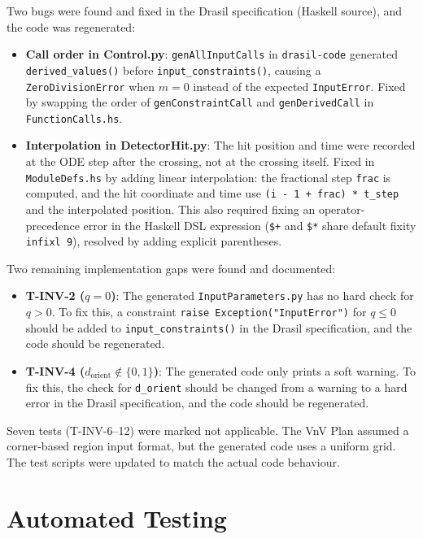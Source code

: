 \documentclass[12pt, titlepage]{article}
\begin{document}
Two bugs were found and fixed in the Drasil specification (Haskell source),
and the code was regenerated:
\begin{itemize}
  \item \textbf{Call order in Control.py}: \texttt{genAllInputCalls} in
        \texttt{drasil-code} generated \texttt{derived\_values()} before
        \texttt{input\_constraints()}, causing a \texttt{ZeroDivisionError}
        when $m=0$ instead of the expected \texttt{InputError}.
        Fixed by swapping the order of \texttt{genConstraintCall} and
        \texttt{genDerivedCall} in \texttt{FunctionCalls.hs}.
  \item \textbf{Interpolation in DetectorHit.py}: The hit position and time were
        recorded at the ODE step after the crossing, not at the crossing itself.
        Fixed in \texttt{ModuleDefs.hs} by adding linear interpolation: the
        fractional step \texttt{frac} is computed, and the hit coordinate and
        time use \texttt{(i - 1 + frac) * t\_step} and the interpolated
        position.
        This also required fixing an operator-precedence error in the Haskell DSL
        expression (\texttt{\$+} and \texttt{\$*} share default fixity
        \texttt{infixl 9}), resolved by adding explicit parentheses.
\end{itemize}

Two remaining implementation gaps were found and documented:
\begin{itemize}
  \item \textbf{T-INV-2 ($q=0$)}: The generated \texttt{InputParameters.py}
        has no hard check for $q>0$.
        To fix this, a constraint \texttt{raise Exception("InputError")} for
        $q \le 0$ should be added to \texttt{input\_constraints()} in the
        Drasil specification, and the code should be regenerated.
  \item \textbf{T-INV-4 ($d_\text{orient} \notin \{0,1\}$)}: The generated
        code only prints a soft warning.
        To fix this, the check for \texttt{d\_orient} should be changed from
        a warning to a hard error in the Drasil specification, and the code
        should be regenerated.
\end{itemize}
Seven tests (T-INV-6--12) were marked not applicable.
The VnV Plan assumed a corner-based region input format, but the generated
code uses a uniform grid.
The test scripts were updated to match the actual code behaviour.

\section{Automated Testing}
\end{document}
